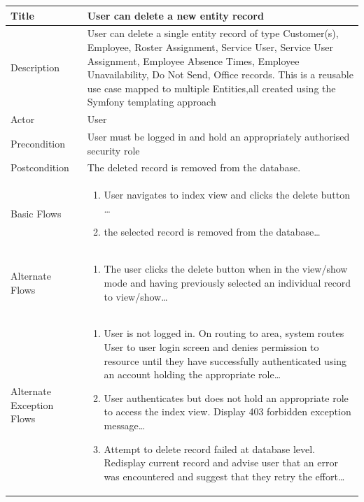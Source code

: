 \documentclass[a4paper,Times New Roman 11pt]{article}
\newcommand\addrow[2]{#1 &#2\\ }
\newcommand\addheading[2]{#1 &#2\\ \hline}
\newcommand\tabularhead{\begin{tabular}{lp{9cm}}
\hline
}
\newcommand\addmulrow[2]{ \begin{minipage}[t][][t]{3cm}#1\end{minipage}%
   &\begin{minipage}[t][][t]{9cm}
    \begin{enumerate} #2   \end{enumerate}
    \end{minipage}\\ }
\newenvironment{usecase}{\tabularhead}
{\hline\end{tabular}}
\begin{document}
\begin{samepage}
\begin{usecase}
    \addheading{Title}{User can delete a new entity record }
  \addheading{Description}{User can delete a single entity record of type Customer(s), Employee, Roster Assignment, Service User, Service User Assignment, Employee Absence Times, Employee Unavailability, Do Not Send, Office records. This is a reusable use case mapped to multiple Entities,all created using the Symfony templating approach}
  \addheading{Actor}{User} 
  \addrow{Precondition}{User must be logged in and hold an appropriately authorised security role}
  \addrow{Postcondition}{The deleted record is removed from the database.}
  \addmulrow{Basic Flows}{\item User navigates to index view and clicks the delete button \ldots
  \item the selected record is removed from the database\ldots}
  \addmulrow{Alternate  Flows}{\item The user clicks the delete button when in the view/show mode and having previously selected an individual record to view/show\ldots}
  \addmulrow{Alternate Exception Flows}{\item User is not logged in. On routing to area, system routes User to user login screen and denies permission to resource until they have successfully authenticated using an account holding the appropriate role\ldots
                                                                      \item User authenticates but does not hold an appropriate role to access the index view. Display 403 forbidden exception message\ldots
                                                                      \item Attempt to delete record failed at database level. Redisplay current record and advise user that an error was encountered and suggest that they retry the effort\ldots}

\end{usecase}



\end{samepage}
\end{document}
